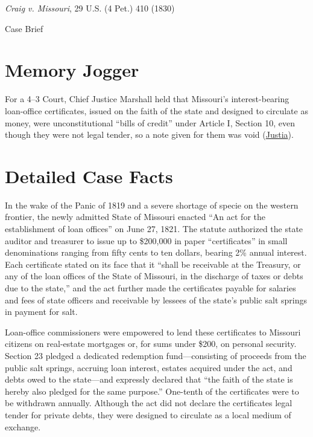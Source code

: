 \documentclass[12pt]{article}
\begin{document}
\begin{center}
{\LARGE \textit{Craig v. Missouri}, 29 U.S. (4 Pet.) 410 (1830)\par}
\vspace{0.8em}
{\large Case Brief\par}
\end{center}
\vspace{1em}

\section{Memory Jogger}
For a 4--3 Court, Chief Justice Marshall held that Missouri's interest-bearing loan-office certificates, issued on the faith of the state and designed to circulate as money, were unconstitutional ``bills of credit'' under Article I, Section 10, even though they were not legal tender, so a note given for them was void (\href{https://supreme.justia.com/cases/federal/us/29/410/}{Justia}).

\section{Detailed Case Facts}
In the wake of the Panic of 1819 and a severe shortage of specie on the western frontier, the newly admitted State of Missouri enacted ``An act for the establishment of loan offices'' on June 27, 1821. The statute authorized the state auditor and treasurer to issue up to \$200,000 in paper ``certificates'' in small denominations ranging from fifty cents to ten dollars, bearing 2\% annual interest. Each certificate stated on its face that it ``shall be receivable at the Treasury, or any of the loan offices of the State of Missouri, in the discharge of taxes or debts due to the state,'' and the act further made the certificates payable for salaries and fees of state officers and receivable by lessees of the state's public salt springs in payment for salt.

Loan-office commissioners were empowered to lend these certificates to Missouri citizens on real-estate mortgages or, for sums under \$200, on personal security. Section 23 pledged a dedicated redemption fund---consisting of proceeds from the public salt springs, accruing loan interest, estates acquired under the act, and debts owed to the state---and expressly declared that ``the faith of the state is hereby also pledged for the same purpose.'' One-tenth of the certificates were to be withdrawn annually. Although the act did not declare the certificates legal tender for private debts, they were designed to circulate as a local medium of exchange.
\end{document}
